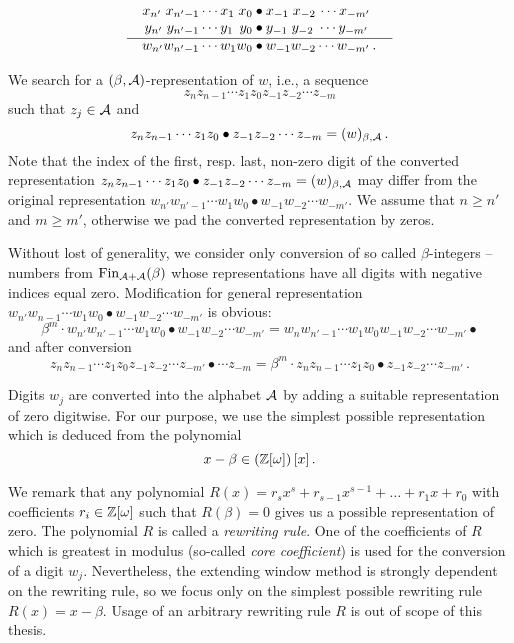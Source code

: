   \begin{align*}
  x_{n'} \;x_{{n'}-1}\cdots x_1 \;x_0 &\bullet x_{-1} \;x_{-2}\, \cdots x_{-m'} \\[-3pt]
  y_{n'} \;y_{{n'}-1}\cdots y_1 \,\;y_0 &\bullet y_{-1} \;y_{-2} \;\cdots y_{-m'} \\[-10pt]
    \line(1,0){90} & \line(1,0){100} \\[-7pt]
  w_{n'} w_{{n'}-1}\cdots w_1 w_0 &\bullet w_{-1} w_{-2} \cdots w_{-m'}\,.
  \end{align*}
  
We search for a $(\beta,\mathcal{A})$-representation of $w$, i.e., a  sequence 
  $$z_{n} z_{n-1}\cdots z_1 z_0 z_{-1} z_{-2} \cdots z_{-m}$$ such that $z_j \in \mathcal{A}$ and
  $$
    z_{n} z_{n-1}\cdots z_1 z_0 \bullet z_{-1} z_{-2} \cdots z_{-m}=(w)_{\beta,\mathcal{A}}\,.
  $$
  Note that the index of the first, resp. last, non-zero digit of the converted representation $z_{n} z_{n-1}\cdots z_1 z_0 \bullet z_{-1} z_{-2} \cdots z_{-m}=(w)_{\beta,\mathcal{A}}$ may differ from the original representation $w_{n'} w_{{n'}-1}\cdots w_1 w_0 \bullet w_{-1} w_{-2} \cdots w_{-m'}$. We assume that $ n\geq n'$ and $m\geq m'$, otherwise we pad the converted representation by zeros.
  
  Without lost of generality, we consider only conversion of so called $\beta$-integers -- numbers from $\text{Fin}_{\mathcal{A}+\mathcal{A}}(\beta)$ whose representations have all digits with negative indices equal zero. Modification for general representation $w_{n'} w_{n-1}\cdots w_1 w_0 \bullet w_{-1} w_{-2} \cdots w_{-m'}$ is obvious:
  $$
  \beta^m \cdot w_{n'} w_{n'-1}\cdots w_1 w_0 \bullet w_{-1} w_{-2} \cdots w_{-m'} = w_{n} w_{n'-1}\cdots w_1 w_0 w_{-1} w_{-2} \cdots w_{-m'} \bullet
  $$  
  and after conversion
  $$
  z_{n} z_{n-1}\cdots z_1 z_0 z_{-1} z_{-2} \cdots z_{-m'}\bullet\cdots z_{-m} = \beta^m \cdot z_{n} z_{n-1}\cdots z_1 z_0 \bullet z_{-1} z_{-2} \cdots z_{-m'}\,. 
  $$  
  
  Digits $w_j$ are converted into the alphabet $\mathcal{A}$ by adding a suitable representation of zero digitwise.
  For our purpose, we use the simplest possible representation which is deduced from the polynomial
  $$
    x-\beta \in \left(\mathbb{Z}[\omega]\right)[x]\,.
  $$

We remark that any polynomial $R(x)=r_s x^s+r_{s-1}x^{s-1}+ \dots + r_1 x+r_0$ with coefficients $r_i \in \mathbb{Z}[\omega]$ such that $R(\beta)=0$ gives us a possible representation of zero. The polynomial $R$ is called a \emph{rewriting rule}. One of the coefficients of $R$ which is greatest in modulus (so-called \emph{core coefficient}) is used for the conversion of a digit $w_j$. Nevertheless, the extending window method is strongly dependent on the rewriting rule, so we focus only on the simplest possible rewriting rule $R(x)=x-\beta$. Usage of an arbitrary rewriting rule $R$ is out of scope of this thesis.

